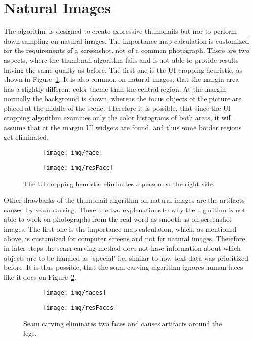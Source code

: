 \documentclass[draft,final]{vutinfth} %
\begin{document}
	\section{Natural Images}
	The algorithm is designed to create expressive thumbnails but nor to perform down-sampling on natural images.
	The importance map calculation is customized for the requirements of a screenshot, not of a common photograph.
	There are two aspects, where the thumbnail algorithm fails and is not able to provide results having the same quality as before.
	The first one is the UI cropping heuristic, as shown in Figure~\ref{fig:nat:face}.
	It is also common on natural images, that the margin area has a slightly different color theme than the central region.
	At the margin normally the background is shown, whereas the focus objects of the picture are placed at the middle of the scene.
	Therefore it is possible, that since the UI cropping algorithm examines only the color histograms of both areas, it will assume that at the margin UI widgets are found, and thus some border regions get eliminated.
	\begin{figure}[H]
		\centering
		\begin{subfigure}[b]{0.45\columnwidth}
			\centering
			\texttt{[image: img/face]}
		\end{subfigure}
		\begin{subfigure}[b]{0.45\columnwidth}
			\centering
			\texttt{[image: img/resFace]}
		\end{subfigure}
		\caption{The UI cropping heuristic eliminates a person on the right side.}
		\label{fig:nat:face}
	\end{figure}  
	Other drawbacks of the thumbnail algorithm on natural images are the artifacts caused by seam carving.
	There are two explanations to why the algorithm is not able to work on photographs from the real word as smooth as on screenshot images.
	The first one is the importance map calculation, which, as mentioned above, is customized for computer screens and not for natural images.
	Therefore,  in later steps the seam carving method does not have information about which objects are to be handled as "special" i.e. similar to how text data was prioritized before.
	It is thus possible, that the seam carving algorithm ignores human faces like it does on Figure~\ref{fig:nat:faces}.	
	\begin{figure}[H]
		\centering
		\begin{subfigure}[b]{0.45\columnwidth}
			\centering
			\texttt{[image: img/faces]}
		\end{subfigure}
		\begin{subfigure}[b]{0.45\columnwidth}
			\centering
			\texttt{[image: img/resFaces]}
		\end{subfigure}
		\caption{Seam carving eliminates two faces and causes artifacts around the legs.}
		\label{fig:nat:faces}
	\end{figure}  
\end{document}
